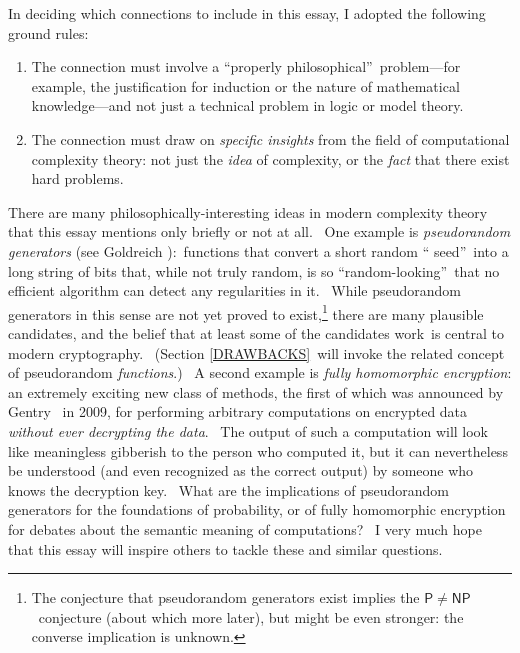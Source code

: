 \documentclass[12pt,onecolumn]{article}%
\begin{document}
In deciding which connections to include in this essay, I adopted the
following ground rules:

\begin{enumerate}
\item[(1)] The connection must involve a \textquotedblleft properly
philosophical\textquotedblright\ problem---for example, the justification for
induction or the nature of mathematical knowledge---and not just a technical
problem in logic or model theory.

\item[(2)] The connection must draw on \textit{specific insights} from the
field of computational complexity theory: not just the \textit{idea} of
complexity, or the \textit{fact} that there exist hard problems.
\end{enumerate}

There are many philosophically-interesting ideas in modern complexity theory
that this essay mentions only briefly or not at all. \ One example is
\textit{pseudorandom generators} (see Goldreich \cite{goldreich:prg}%
):\ functions that convert a short random \textquotedblleft
seed\textquotedblright\ into a long string of bits that, while not truly
random, is so \textquotedblleft random-looking\textquotedblright\ that no
efficient algorithm can detect any regularities in it. \ While pseudorandom
generators in this sense are not yet proved to exist,\footnote{The conjecture
that pseudorandom generators exist implies the $\mathsf{P}\neq\mathsf{NP}%
$\ conjecture (about which more later), but might be even stronger: the
converse implication is unknown.} there are many plausible candidates, and the
belief that at least some of the candidates work\ is central to modern
cryptography. \ (Section \ref{DRAWBACKS}\ will invoke the related concept of
pseudorandom \textit{functions}.) \ A second example is \textit{fully
homomorphic encryption}: an extremely exciting new class of methods, the first
of which was announced by Gentry \cite{gentry}\ in 2009, for performing
arbitrary computations on encrypted data \textit{without ever decrypting the
data}. \ The output of such a computation will look like meaningless gibberish
to the person who computed it, but it can nevertheless be understood (and even
recognized as the correct output) by someone who knows the decryption key.
\ What are the implications of pseudorandom generators for the foundations of
probability, or of fully homomorphic encryption for debates about the semantic
meaning of computations? \ I very much hope that this essay will inspire
others to tackle these and similar questions.
\end{document}
